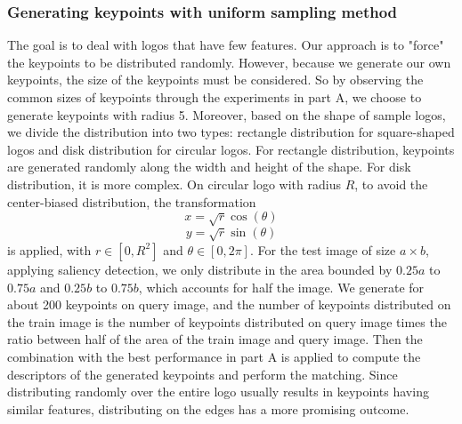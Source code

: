 \documentclass[letterpaper, 10 pt, conference]{ieeeconf}  %
\begin{document}
\subsubsection{Generating keypoints with uniform sampling method}
The goal is to deal with logos that have few features. Our approach is to "force" the keypoints to be distributed randomly. However, because we generate our own keypoints, the size of the keypoints must be considered. So by observing the common sizes of keypoints through the experiments in part A, we choose to generate keypoints with radius 5. Moreover, based on the shape of sample logos, we divide the distribution into two types: rectangle distribution for square-shaped logos and disk distribution for circular logos. For rectangle distribution, keypoints are generated randomly along the width and height of the shape. For disk distribution, it is more complex. On circular logo with radius $R$, to avoid the center-biased distribution, the transformation \[x = \sqrt{r}\cos(\theta)\] \[y = \sqrt{r}\sin(\theta)\] is applied, with $r \in [0, R^2]$ and $\theta \in [0,2\pi]$\cite{disk}. For the test image of size $a \times b$, applying saliency detection\cite{saliency}, we only distribute in the area bounded by $0.25a$ to $0.75a$ and $0.25b$ to $0.75b$, which accounts for half the image. We generate for about 200 keypoints on query image, and the number of keypoints distributed on the train image is the number of keypoints distributed on query image times the ratio between half of the area of the train image and query image. Then the combination with the best performance in part A is applied to compute the descriptors of the generated keypoints and perform the matching. Since distributing randomly over the entire logo usually results in keypoints having similar features, distributing on the edges has a more promising outcome.
\end{document}
